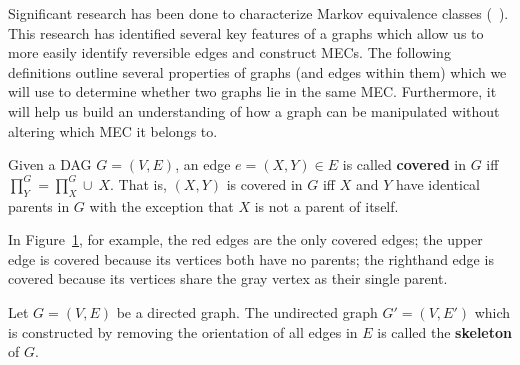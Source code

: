 \null \quad \quad Significant research has been done to characterize Markov equivalence classes (~\cite{chickering, verma, andersson}). This research has identified several key features of a graphs which allow us to more easily identify reversible edges and construct MECs. The following definitions outline several properties of graphs (and edges within them) which we will use to determine whether two graphs lie in the same MEC. Furthermore, it will help us build an understanding of how a graph can be manipulated without altering which MEC it belongs to. 


\begin{definition}\label{defcoverededge} 
Given a DAG $G=(V,E)$, an edge $e = (X, Y) \in E$ is called \textbf{covered} in $G$ iff $\prod\nolimits_{Y}^{G} = \prod\nolimits_{X}^{G} \cup \ X$. That is, $(X, Y)$ is covered in $G$ iff $X$ and $Y$ have identical parents in $G$ with the exception that $X$ is not a parent of itself.
\end{definition}

\begin{center}
\begin{figure}[h!]
\centering
{}
\caption{ }
\label{fig:covedge}
\end{figure}
\end{center}

In Figure~\ref{fig:covedge}, for example, the red edges are the only covered edges; the upper edge is covered because its vertices both have no parents; the righthand edge is covered because its vertices share the gray vertex as their single parent. 




\begin{definition} [Skeleton]
Let $G=(V,E)$ be a directed graph. The undirected graph $G' = (V, E')$ which is constructed by removing the orientation of all edges in $E$ is called the \textbf{skeleton} of $G$. 
\end{definition}
 
